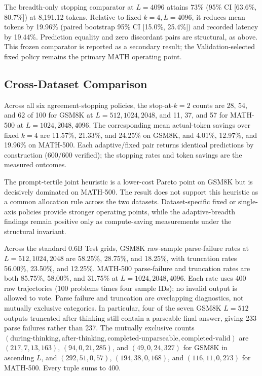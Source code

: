 \documentclass[runningheads]{llncs}
\begin{document}
The breadth-only stopping comparator at $L=4096$ attains 73\% (95\% CI
[63.6\%, 80.7\%]) at 8,191.12 tokens. Relative to fixed $k=4,L=4096$, it
reduces mean tokens by 19.96\% (paired bootstrap 95\% CI [15.0\%, 25.4\%]) and
recorded latency by 19.44\%. Prediction equality and zero discordant pairs are
structural, as above. This frozen comparator is reported as a secondary result; the
Validation-selected fixed policy remains the primary MATH operating point.

\subsection{Cross-Dataset Comparison}

Across all six agreement-stopping policies, the stop-at-$k=2$ counts are
28, 54, and 62 of 100 for GSM8K at $L=512,1024,2048$, and 11, 37, and 57
for MATH-500 at $L=1024,2048,4096$. The corresponding mean actual-token
savings over fixed $k=4$ are 11.57\%, 21.33\%, and 24.25\% on GSM8K, and
4.01\%, 12.97\%, and 19.96\% on MATH-500. Each adaptive/fixed pair returns
identical predictions by construction (600/600 verified); the stopping rates
and token savings are the measured outcomes.

The prompt-tertile joint heuristic is a lower-cost Pareto point on GSM8K but is
decisively dominated on MATH-500. The result does not support this heuristic as
a common allocation rule across the two datasets. Dataset-specific fixed or single-axis policies
provide stronger operating points, while the adaptive-breadth findings remain
positive only as compute-saving measurements under the structural invariant.

Across the standard 0.6B Test grids, GSM8K raw-sample parse-failure rates at
$L=512,1024,2048$ are 58.25\%, 28.75\%, and 18.25\%, with truncation rates
56.00\%, 23.50\%, and 12.25\%. MATH-500 parse-failure and truncation rates are
both 85.75\%, 58.00\%, and 31.75\% at $L=1024,2048,4096$. Each rate uses 400 raw
trajectories (100 problems times four sample IDs); no invalid output is allowed
to vote. Parse failure and truncation are overlapping diagnostics, not mutually
exclusive categories. In particular, four of the seven GSM8K $L=512$ outputs
truncated after thinking still contain a parseable final answer, giving 233
parse failures rather than 237. The mutually exclusive counts
$(\text{during-thinking},\text{after-thinking},\text{completed-unparseable},
\text{completed-valid})$ are $(217,7,13,163)$, $(94,0,21,285)$, and
$(49,0,24,327)$ for GSM8K in ascending $L$, and $(292,51,0,57)$,
$(194,38,0,168)$, and $(116,11,0,273)$ for MATH-500. Every tuple sums to 400.
\end{document}
